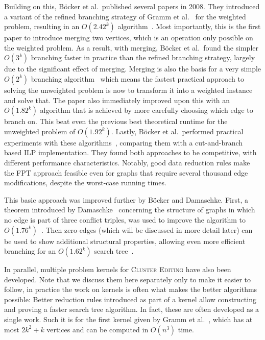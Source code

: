 \documentclass[12pt,oneside,english,parskip=full,headings=small]{scrbook}
\theoremstyle{definition}
\begin{document}
Building on this, Böcker et al.\ published several papers in 2008. They introduced a variant of the
refined branching strategy of Gramm et al.~\cite{Gramm} for the weighted problem, resulting in an
$O(2.42^k)$ algorithm~\cite{AnApproach}. Most importantly, this is the first paper to introduce
merging two vertices, which is an operation only possible on the weighted problem. As a result, with
merging, Böcker et al.\ found the simpler $O(3^k)$ branching faster in practice than the refined
branching strategy, largely due to the significant effect of merging. Merging is also the basis for
a very simple $O(2^k)$ branching algorithm~\cite{GoingWeighted} which means the fastest practical
approach to solving the unweighted problem is now to transform it into a weighted instance and solve
that. The paper also immediately improved upon this with an $O(1.82^k)$ algorithm that is achieved
by more carefully choosing which edge to branch on. This beat even the previous best theoretical
runtime for the unweighted problem of $O(1.92^k)$. Lastly, Böcker et al.\ performed practical
experiments with these algorithms~\cite{ExactAlgos}, comparing them with a cut-and-branch based ILP
implementation. They found both approaches to be competitive, with different performance
characteristics. Notably, good data reduction rules make the FPT approach feasible even for graphs
that require several thousand edge modifications, despite the worst-case running times.

This basic approach was improved further by Böcker and Damaschke. First, a theorem introduced by
Damaschke~\cite{BoundedDegree} concerning the structure of graphs in which no edge is part of three
conflict triples, was used to improve the algorithm to $O(1.76^k)$~\cite{EvenFaster}. Then
zero-edges (which will be discussed in more detail later) can be used to show additional structural
properties, allowing even more efficient branching for an $O(1.62^k)$ search tree~\cite{GoldenRatio}.

In parallel, multiple problem kernels for \textsc{Cluster Editing} have also been developed. Note
that we discuss them here separately only to make it easier to follow, in practice the work on
kernels is often what makes the better algorithms possible: Better reduction rules introduced as
part of a kernel allow constructing and proving a faster search tree algorithm. In fact, these are
often developed as a single work. Such it is for the first kernel given by Gramm et al.~\cite{Gramm},
which has at most $2k^2 + k$ vertices and can be computed in $O(n^3)$ time.
\end{document}
